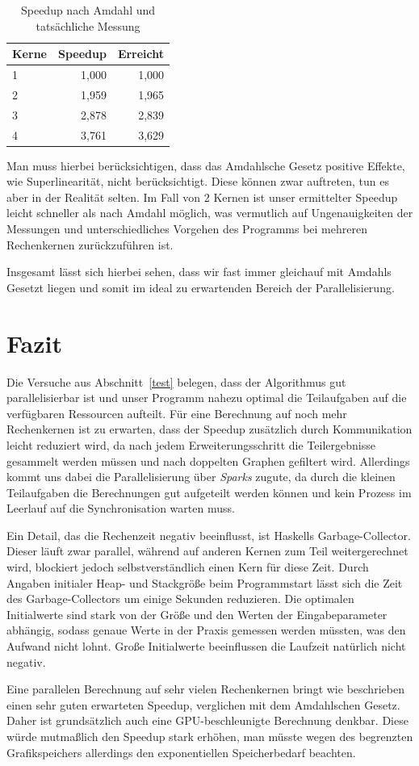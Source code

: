 \documentclass[a4paper]{scrartcl}
\begin{document}
\begin{table}
\caption{Speedup nach Amdahl und tatsächliche Messung}
\centering
 \begin{tabular}[h!]{l||r|r}
  Kerne & Speedup & Erreicht \\
  \hline
  \hline
   1 & 1,000& 1,000 \\
   2 & 1,959 & 1,965 \\
   3 & 2,878 & 2,839 \\
   4 & 3,761 & 3,629
 \end{tabular}
 \label{tab:Amdahl}
\end{table}

Man muss hierbei berücksichtigen, dass das Amdahlsche Gesetz positive Effekte, wie Superlinearität, nicht berücksichtigt. Diese können zwar auftreten, tun es aber in der Realität selten. Im Fall von 2 Kernen ist unser ermittelter Speedup leicht schneller als nach Amdahl möglich, was vermutlich auf Ungenauigkeiten der Messungen und unterschiedliches Vorgehen des Programms bei mehreren Rechenkernen zurückzuführen ist.\par
\medskip
Insgesamt lässt sich hierbei sehen, dass wir fast immer gleichauf mit Amdahls Gesetzt liegen und somit im ideal zu erwartenden Bereich der Parallelisierung.


\section{Fazit}

Die Versuche aus Abschnitt~\ref{test} belegen, dass der Algorithmus gut parallelisierbar ist und unser Programm nahezu optimal die Teilaufgaben auf die verfügbaren Ressourcen aufteilt. Für eine Berechnung auf noch mehr Rechenkernen ist zu erwarten, dass der Speedup zusätzlich durch Kommunikation leicht reduziert wird, da nach jedem Erweiterungsschritt die Teilergebnisse gesammelt werden müssen und nach doppelten Graphen gefiltert wird. Allerdings kommt uns dabei die Parallelisierung über \emph{Sparks} zugute, da durch die kleinen Teilaufgaben die Berechnungen gut aufgeteilt werden können und kein Prozess im Leerlauf auf die Synchronisation warten muss. \par
\medskip
Ein Detail, das die Rechenzeit negativ beeinflusst, ist Haskells Garbage-Collector. Dieser läuft zwar parallel, während auf anderen Kernen zum Teil weitergerechnet wird, blockiert jedoch selbstverständlich einen Kern für diese Zeit. Durch Angaben initialer Heap- und Stackgröße beim Programmstart lässt sich die Zeit des Garbage-Collectors um einige Sekunden reduzieren. Die optimalen Initialwerte sind stark von der Größe und den Werten der Eingabeparameter abhängig, sodass genaue Werte in der Praxis gemessen werden müssten, was den Aufwand nicht lohnt. Große Initialwerte beeinflussen die Laufzeit natürlich nicht negativ.\par
\medskip
Eine parallelen Berechnung auf sehr vielen Rechenkernen bringt wie beschrieben einen sehr guten erwarteten Speedup, verglichen mit dem Amdahlschen Gesetz. Daher ist grundsätzlich auch eine GPU-beschleunigte Berechnung denkbar. Diese würde mutmaßlich den Speedup stark erhöhen, man müsste wegen des begrenzten Grafikspeichers allerdings den exponentiellen Speicherbedarf beachten.

\end{document}

